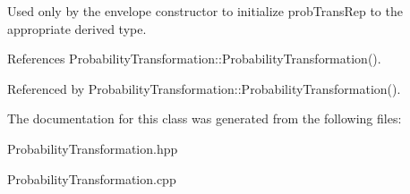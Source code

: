Used only by the envelope constructor to initialize prob\+Trans\+Rep to the appropriate derived type. 

References Probability\+Transformation\+::\+Probability\+Transformation().



Referenced by Probability\+Transformation\+::\+Probability\+Transformation().



The documentation for this class was generated from the following files\+:\begin{DoxyCompactItemize}
\item 
Probability\+Transformation.\+hpp\item 
Probability\+Transformation.\+cpp\end{DoxyCompactItemize}
